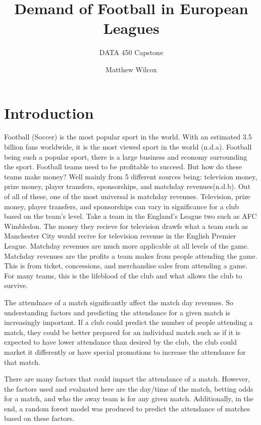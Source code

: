 \documentclass[
  letterpaper,
  DIV=11,
  numbers=noendperiod]{scrartcl}
\title{Demand of Football in European Leagues}
\subtitle{DATA 450 Capstone}
\author{Matthew Wilcox}
\date{}
\begin{document}
\maketitle
\ifdefined\Shaded\renewenvironment{Shaded}{\begin{tcolorbox}[interior hidden, borderline west={3pt}{0pt}{shadecolor}, enhanced, sharp corners, frame hidden, breakable, boxrule=0pt]}{\end{tcolorbox}}\fi

\hypertarget{introduction}{%
\section{Introduction}\label{introduction}}

Football (Soccer) is the most popular sport in the world. With an
estimated 3.5 billion fans worldwide, it is the most viewed sport in the
world (n.d.a). Football being such a popular sport, there is a large
business and economy surrounding the sport. Football teams need to be
profitable to succeed. But how do these teams make money? Well mainly
from 5 different sources being: television money, prize money, player
transfers, sponsorships, and matchday revenues(n.d.b). Out of all of
these, one of the most universal is matchday revenues. Television, prize
money, player transfers, and sponsorships can vary in significance for a
club based on the team's level. Take a team in the England's League two
such as AFC Wimbledon. The money they recieve for television drawfs what
a team such as Manchester City would recive for television revenue in
the English Premier League. Matchday revenues are much more applicable
at all levels of the game. Matchday revenues are the profits a team
makes from people attending the game. This is from ticket, concessions,
and merchandise sales from attending a game. For many teams, this is the
lifeblood of the club and what allows the club to survive.

The attendnace of a match significantly affect the match day revenues.
So understanding factors and predicting the attendance for a given match
is increasingly important. If a club could predict the number of people
attending a match, they could be better prepared for an individual match
such as if it is expected to have lower attendance than desired by the
club, the club could market it differently or have special promotions to
increase the attendance for that match.

There are many factors that could impact the attendance of a match.
However, the factors used and evaluated here are the day/time of the
match, betting odds for a match, and who the away team is for any given
match. Additionally, in the end, a random forest model was produced to
predict the attendance of matches based on these factors.
\end{document}
